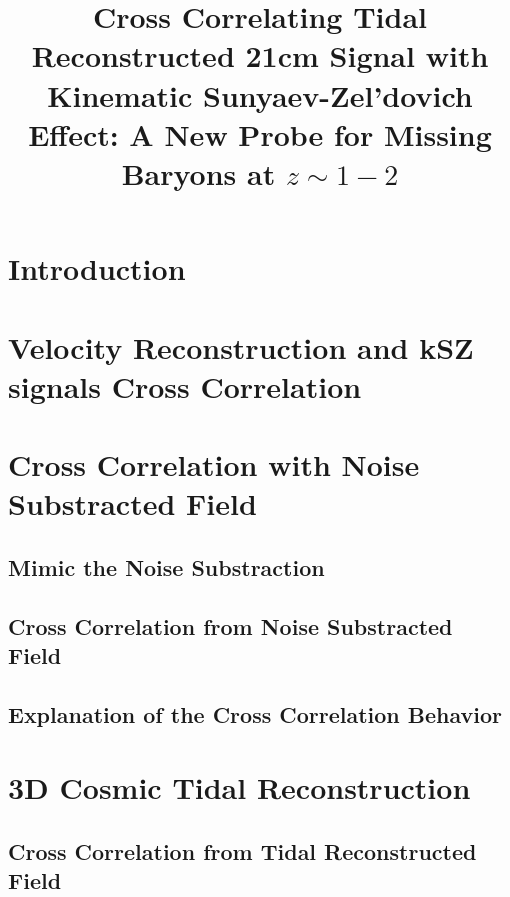 \documentclass[aps,prd,twocolumn,showpacs,superscriptaddress,groupedaddress,nofootinbib]{revtex4}  %
\begin{document}
\widetext

\title{Cross Correlating Tidal Reconstructed 21cm Signal with Kinematic Sunyaev-Zel'dovich Effect: A New Probe for Missing Baryons at $z\sim1-2$}


\pacs{}
\maketitle

\section{Introduction}


\section{Velocity Reconstruction and kSZ signals Cross Correlation}

\section{Cross Correlation with Noise Substracted Field} 
\subsection{Mimic the Noise Substraction}

\subsection{Cross Correlation from Noise Substracted Field}

\subsection{Explanation of the Cross Correlation Behavior}

\section{3D Cosmic Tidal Reconstruction}

\subsection{Cross Correlation from Tidal Reconstructed Field}

\end{document}
